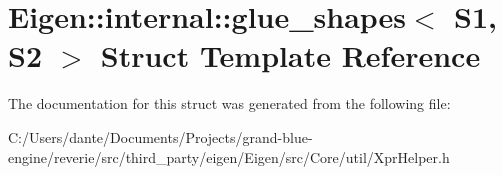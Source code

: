 \hypertarget{struct_eigen_1_1internal_1_1glue__shapes}{}\section{Eigen\+::internal\+::glue\+\_\+shapes$<$ S1, S2 $>$ Struct Template Reference}
\label{struct_eigen_1_1internal_1_1glue__shapes}


The documentation for this struct was generated from the following file\+:\begin{DoxyCompactItemize}
\item 
C\+:/\+Users/dante/\+Documents/\+Projects/grand-\/blue-\/engine/reverie/src/third\+\_\+party/eigen/\+Eigen/src/\+Core/util/Xpr\+Helper.\+h\end{DoxyCompactItemize}
